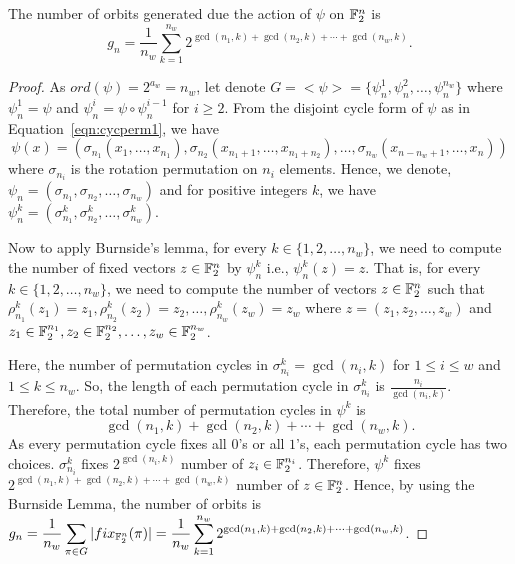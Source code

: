 \documentclass{llncs}
\begin{document}


\begin{theorem}
The number of orbits generated due the action of $\psi$ on $\mathbb{F}_2^n$ is
$$g_n= \frac{1}{n_w} \sum_{k=1}^{n_w}  2^{\gcd(n_1,k)+ \gcd(n_2,k) + \cdots + \gcd(n_w,k)}.$$
\end{theorem}
\begin{proof}
As $ord(\psi) = 2^{a_w} = n_w$, let denote $G = <\psi> = \{\psi_n^1,\psi_n^2, \ldots, \psi_n^{n_w}\}$ where $\psi_n^1 = \psi$ and $\psi_n^i = \psi \circ \psi_n^{i-1}$ for $i \geq 2$. From the disjoint cycle form of $\psi$ as in Equation~\ref{eqn:cycperm1}, we have 
$$\psi(x) = (\sigma_{n_1}(x_1,\ldots,x_{n_1}), \sigma_{n_2}(x_{n_1+1},\ldots,x_{n_1+n_2}), \ldots, \sigma_{n_w}(x_{n-n_w+1},\ldots,x_n))$$
where $\sigma_{n_i}$ is the rotation permutation on $n_i$ elements.
Hence, we denote, $\psi_n = (\sigma_{n_1},\sigma_{n_2},\ldots,\sigma_{n_w})$ and for positive integers $k$, we have $\psi_n^k = (\sigma_{n_1}^k,\sigma_{n_2}^k,\ldots,\sigma_{n_w}^k)$.

Now to apply Burnside's lemma, for every $k \in \{1, 2, \ldots, n_w\}$, we need to compute the number of fixed vectors $z \in \mathbb{F}_2^n$ by $\psi_n^k$ i.e., $\psi_n^k(z) = z$. That is, for every $k \in \{1, 2, \ldots, n_w\}$, we need to compute the number of vectors $z \in \mathbb{F}_2^n$ such that $\rho_{n_1}^k(z_1) = z_1, \rho_{n_2}^k(z_2) = z_2, \ldots, \rho_{n_w}^k(z_w) = z_w$ where $z = (z_1,z_2, \ldots, z_w)$ and $z_1 \in \mathbb{F}_2^{n_1}, z_2 \in \mathbb{F}_2^{n_2}, \ldots, z_w \in \mathbb{F}_2^{n_w}$.

Here, the number of permutation cycles in $\sigma_{n_i}^k= \gcd(n_i,k)$ for $1 \leq i \leq w$ and $1 \leq k \leq n_w$. So, the length of each permutation cycle in $\sigma_{n_i}^k$ is $\frac{n_i}{\gcd(n_i,k)}$. 
Therefore, the total number of permutation cycles in $\psi^k$ is $$\gcd(n_1,k)+ \gcd(n_2,k) + \cdots + \gcd(n_w,k).$$
As every permutation cycle fixes all $0$'s or all $1$'s, each permutation cycle has two choices.
$\sigma_{n_i}^k$ fixes $2^{\gcd(n_i,k)}$ number of $z_i \in \mathbb{F}_2^{n_i}$. Therefore, $\psi^k$ fixes $2^{\gcd(n_1,k)+ \gcd(n_2,k) + \cdots + \gcd(n_w,k)}$ number of $z \in \mathbb{F}_2^n$. Hence, by using the Burnside Lemma, the number of orbits is\\
$\displaystyle{g_n = \frac{1}{n_w} \sum_{\pi \in G} |fix_{\mathbb{F}_2^n}(\pi)| 
    = \frac{1}{n_w} \sum_{k=1}^{n_w}  2^{\gcd(n_1,k)+ \gcd(n_2,k) + \cdots + \gcd(n_w,k)}}$.
\end{proof}
\end{document}
